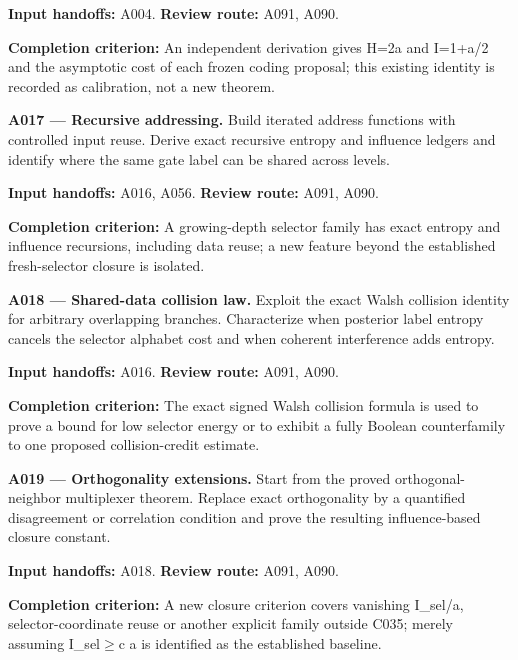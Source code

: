 \documentclass[11pt]{article}
\begin{document}
{\small\color{ink}\textbf{Input handoffs:} A004. \textbf{Review route:} A091, A090.\par
\textbf{Completion criterion:} An independent derivation gives H=2a and I=1+a/2 and the asymptotic cost of each frozen coding proposal; this existing identity is recorded as calibration, not a new theorem.\par}



\textbf{A017 --- Recursive addressing.} Build iterated address functions with controlled input reuse. Derive exact recursive entropy and influence ledgers and identify where the same gate label can be shared across levels.

{\small\color{ink}\textbf{Input handoffs:} A016, A056. \textbf{Review route:} A091, A090.\par
\textbf{Completion criterion:} A growing-depth selector family has exact entropy and influence recursions, including data reuse; a new feature beyond the established fresh-selector closure is isolated.\par}



\textbf{A018 --- Shared-data collision law.} Exploit the exact Walsh collision identity for arbitrary overlapping branches. Characterize when posterior label entropy cancels the selector alphabet cost and when coherent interference adds entropy.

{\small\color{ink}\textbf{Input handoffs:} A016. \textbf{Review route:} A091, A090.\par
\textbf{Completion criterion:} The exact signed Walsh collision formula is used to prove a bound for low selector energy or to exhibit a fully Boolean counterfamily to one proposed collision-credit estimate.\par}



\textbf{A019 --- Orthogonality extensions.} Start from the proved orthogonal-neighbor multiplexer theorem. Replace exact orthogonality by a quantified disagreement or correlation condition and prove the resulting influence-based closure constant.

{\small\color{ink}\textbf{Input handoffs:} A018. \textbf{Review route:} A091, A090.\par
\textbf{Completion criterion:} A new closure criterion covers vanishing I\_sel/a, selector-coordinate reuse or another explicit family outside C035; merely assuming I\_sel$\ge$c a is identified as the established baseline.\par}
\end{document}
